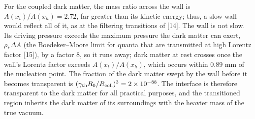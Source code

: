 \documentclass[preprint,12pt]{elsarticle}
\begin{document}
For the coupled dark matter, the mass ratio across the wall is $A(x_t)/A(x_h)=2.72$, far greater than its kinetic energy; thus, a slow wall would reflect all of it, as at the filtering transitions of [14]. The wall is not slow. Its driving pressure exceeds the maximum pressure the dark matter can exert, $\rho_*\Delta A$ (the Boedeker--Moore limit for quanta that are transmitted at high Lorentz factor [15]), by a factor 8, so it runs away; dark matter at rest crosses once the wall's Lorentz factor exceeds $A(x_t)/A(x_h)$, which occurs within 0.89 mm of the nucleation point. The fraction of the dark matter swept by the wall before it becomes transparent is $(\gamma_{\rm th}R_0/R_{\rm coll})^3=2\times10^{-88}$. The interface is therefore transparent to the dark matter for all practical purposes, and the transitioned region inherits the dark matter of its surroundings with the heavier mass of the true vacuum.
\end{document}
